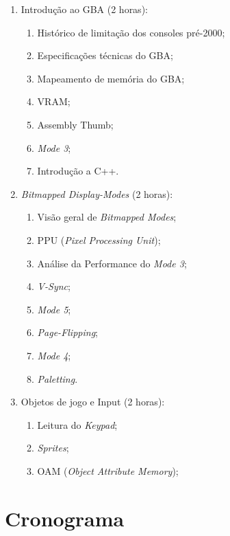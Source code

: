 \documentclass{article}
\begin{document}
\begin{enumerate}
    \item Introdução ao GBA (2 horas):
        \begin{enumerate}
            \item Histórico de limitação dos consoles pré-2000;
            \item Especificações técnicas do GBA\@;
            \item Mapeamento de memória do GBA\@;
            \item VRAM\@;
            \item Assembly Thumb;
            \item \textit{Mode 3};
            \item Introdução a C++.
        \end{enumerate}
    \item \textit{Bitmapped Display-Modes} (2 horas):
        \begin{enumerate}
            \item Visão geral de \textit{Bitmapped Modes};
            \item PPU (\textit{Pixel Processing Unit});
            \item Análise da Performance do \textit{Mode 3};
            \item \textit{V-Sync};
            \item \textit{Mode 5};
            \item \textit{Page-Flipping};
            \item \textit{Mode 4};
            \item \textit{Paletting}.
        \end{enumerate}
    \item Objetos de jogo e Input (2 horas):
        \begin{enumerate}
            \item Leitura do \textit{Keypad};
            \item \textit{Sprites};
            \item OAM (\textit{Object Attribute Memory});
        \end{enumerate}
\end{enumerate}

\section{Cronograma}
\end{document}

